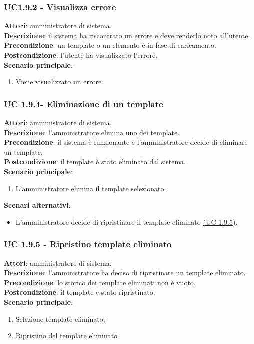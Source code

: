\subsubsection{UC1.9.2 - Visualizza errore}{
	\label{uc1.9.2}
	\textbf{Attori}: amministratore di sistema. \\
	\textbf{Descrizione}: il sistema ha riscontrato un errore e deve renderlo noto all'utente. \\
	\textbf{Precondizione}: un template o un elemento è in fase di caricamento.	\\
	\textbf{Postcondizione}: l'utente ha visualizzato l'errore.	\\
	\textbf{Scenario principale}:
	\begin{enumerate}
		\item Viene visualizzato un errore.
	\end{enumerate}
	}
\subsubsection{UC 1.9.4- Eliminazione di un template}{
	\label{uc1.9.4}
	\textbf{Attori}: amministratore di sistema. \\
	\textbf{Descrizione}: l'amministratore elimina uno dei template. \\
	\textbf{Precondizione}: il sistema è funzionante e l'amministratore decide di eliminare un template.	\\
	\textbf{Postcondizione}: il template è stato eliminato dal sistema.	\\
	\textbf{Scenario principale}:
	\begin{enumerate}
		\item L’amministratore elimina il template selezionato.
	\end{enumerate}
	\textbf{Scenari alternativi}:
	\begin{itemize}
		\item L'amministratore decide di ripristinare il template eliminato \hyperref[uc1.9.5]{(UC 1.9.5)}.
	\end{itemize}
	}
\subsubsection{UC 1.9.5 - Ripristino template eliminato}{
	\label{uc1.9.5}
	\textbf{Attori}: amministratore di sistema. \\
	\textbf{Descrizione}: l'amministratore ha deciso di ripristinare un template eliminato. \\
	\textbf{Precondizione}: lo storico dei template eliminati non è vuoto.	\\
	\textbf{Postcondizione}: il template è stato ripristinato.	\\
	\textbf{Scenario principale}:
	\begin{enumerate}
		\item Selezione template eliminato; 
		\item Ripristino del template eliminato.
	\end{enumerate}
	}

